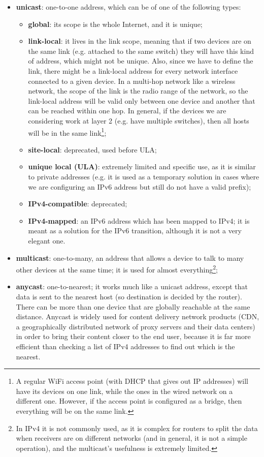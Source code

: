 \begin{itemize}
    \item \textbf{unicast}: one-to-one address, which can be of one of the following types:
    
    \begin{itemize}
        \item \textbf{global}: its scope is the whole Internet, and it is unique;
        \item \textbf{link-local}: it lives in the link scope, meaning that if two devices are on the same link (e.g. attached to the same switch) they will have this kind of address, which might not be unique. Also, since we have to define the link, there might be a link-local address for every network interface connected to a given device. In a multi-hop network like a wireless network, the scope of the link is the radio range of the network, so the link-local address will be valid only between one device and another that can be reached within one hop. In general, if the devices we are considering work at layer 2 (e.g. have multiple switches), then all hosts will be in the same link\footnote{A regular WiFi access point (with DHCP that gives out IP addresses) will have its devices on one link, while the ones in the wired network on a different one. However, if the access point is configured as a bridge, then everything will be on the same link.};
        \item \textbf{site-local}: deprecated, used before ULA;
        \item \textbf{unique local (ULA)}: extremely limited and specific use, as it is similar to private addresses (e.g. it is used as a temporary solution in cases where we are configuring an IPv6 address but still do not have a valid prefix);
        \item \textbf{IPv4-compatible}: deprecated;
        \item \textbf{IPv4-mapped}: an IPv6 address which has been mapped to IPv4; it is meant as a solution for the IPv6 transition, although it is not a very elegant one.
    \end{itemize}
    
    \item \textbf{multicast}: one-to-many, an address that allows a device to talk to many other devices at the same time; it is used for almost everything\footnote{In IPv4 it is not commonly used, as it is complex for routers to split the data when receivers are on different networks (and in general, it is not a simple operation), and the multicast's usefulness is extremely limited.};
    \item \textbf{anycast}: one-to-nearest; it works much like a unicast address, except that data is sent to the nearest host (so destination is decided by the router). There can be more than one device that are globally reachable at the same distance. Anycast is widely used for content delivery network products (CDN, a geographically distributed network of proxy servers and their data centers) in order to bring their content closer to the end user, because it is far more efficient than checking a list of IPv4 addresses to find out which is the nearest.
\end{itemize}

